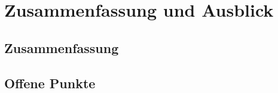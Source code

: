 \chapter{Zusammenfassung und Ausblick}
\label{ch:fazit}

\section{Zusammenfassung}

\section{Offene Punkte}
